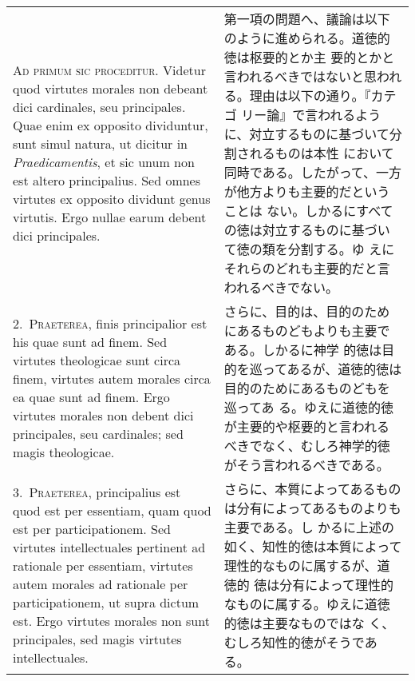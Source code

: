\documentclass[10pt]{jsarticle}
\begin{document}
\begin{longtable}{p{21em}p{21em}}

{\scshape Ad primum sic proceditur}. Videtur quod virtutes morales non
debeant dici cardinales, seu principales. Quae enim ex opposito
dividuntur, sunt simul natura, ut dicitur in {\itshape
Praedicamentis}, et sic unum non est altero principalius. Sed omnes
virtutes ex opposito dividunt genus virtutis. Ergo nullae earum debent
dici principales.


&

 第一項の問題へ、議論は以下のように進められる。道徳的徳は枢要的とか主
 要的とかと言われるべきではないと思われる。理由は以下の通り。『カテゴ
 リー論』で言われるように、対立するものに基づいて分割されるものは本性
 において同時である。したがって、一方が他方よりも主要的だということは
 ない。しかるにすべての徳は対立するものに基づいて徳の類を分割する。ゆ
 えにそれらのどれも主要的だと言われるべきでない。
 
\\



2.~{\scshape Praeterea}, finis principalior est his quae sunt ad
finem. Sed virtutes theologicae sunt circa finem, virtutes autem
morales circa ea quae sunt ad finem. Ergo virtutes morales non debent
dici principales, seu cardinales; sed magis theologicae.

&

さらに、目的は、目的のためにあるものどもよりも主要である。しかるに神学
的徳は目的を巡ってあるが、道徳的徳は目的のためにあるものどもを巡ってあ
る。ゆえに道徳的徳が主要的や枢要的と言われるべきでなく、むしろ神学的徳
がそう言われるべきである。
 
\\



3.~{\scshape Praeterea}, principalius est quod est per essentiam, quam
quod est per participationem. Sed virtutes intellectuales pertinent ad
rationale per essentiam, virtutes autem morales ad rationale per
participationem, ut supra dictum est. Ergo virtutes morales non sunt
principales, sed magis virtutes intellectuales.

&

さらに、本質によってあるものは分有によってあるものよりも主要である。し
かるに上述の如く、知性的徳は本質によって理性的なものに属するが、道徳的
徳は分有によって理性的なものに属する。ゆえに道徳的徳は主要なものではな
く、むしろ知性的徳がそうである。
 
\\




\end{longtable}
\end{document}
